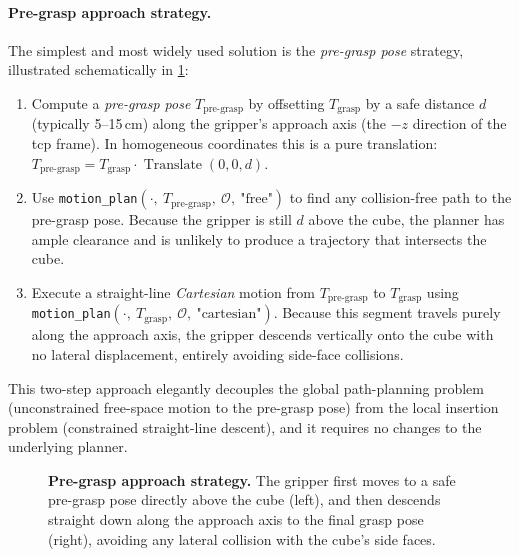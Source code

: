 \documentclass{article}
\begin{document}
\paragraph{Pre-grasp approach strategy.}
The simplest and most widely used solution is the \emph{pre-grasp pose} strategy, illustrated
schematically in \cref{fig:pregrasp}:

\begin{enumerate}[leftmargin=*]
  \item Compute a \emph{pre-grasp pose} $T_{\text{pre-grasp}}$ by offsetting $T_{\text{grasp}}$
        by a safe distance $d$ (typically 5–15\,cm) along the gripper's approach axis (the
        $-z$ direction of the \ac{tcp} frame).
        In homogeneous coordinates this is a pure translation:
        $T_{\text{pre-grasp}} = T_{\text{grasp}} \cdot \operatorname{Translate}(0, 0, d)$.

  \item Use \texttt{motion\_plan}$(\cdot,\ T_{\text{pre-grasp}},\ \mathcal{O},\ \text{"free"})$
        to find any collision-free path to the pre-grasp pose.
        Because the gripper is still $d$ above the cube, the planner has ample clearance and
        is unlikely to produce a trajectory that intersects the cube.

  \item Execute a straight-line \emph{Cartesian} motion from $T_{\text{pre-grasp}}$ to
        $T_{\text{grasp}}$ using
        \texttt{motion\_plan}$(\cdot,\ T_{\text{grasp}},\ \mathcal{O},\ \text{"cartesian"})$.
        Because this segment travels purely along the approach axis, the gripper descends
        vertically onto the cube with no lateral displacement, entirely avoiding side-face
        collisions.
\end{enumerate}

This two-step approach elegantly decouples the global path-planning problem (unconstrained
free-space motion to the pre-grasp pose) from the local insertion problem (constrained
straight-line descent), and it requires no changes to the underlying planner.

\begin{figure}[t!]
    \centering
    \fbox{\rule[-.5cm]{0cm}{4cm} \rule[-.5cm]{8cm}{0cm}}
    \caption{\textbf{Pre-grasp approach strategy.}
             The gripper first moves to a safe pre-grasp pose directly above the cube
             (left), and then descends straight down along the approach axis to the final
             grasp pose (right), avoiding any lateral collision with the cube's side faces.}
    \label{fig:pregrasp}
\end{figure}
\end{document}
